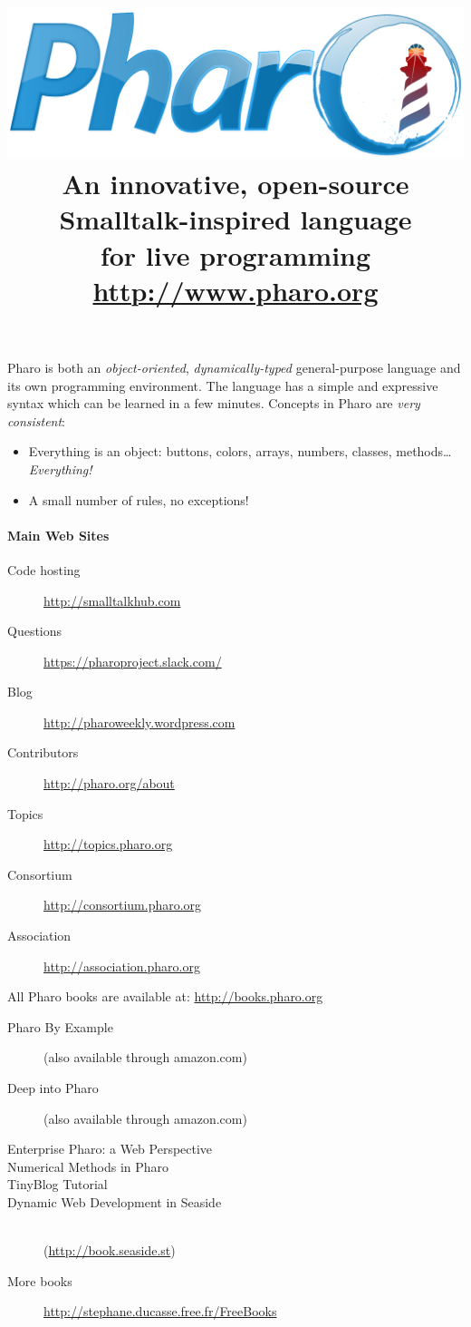 \documentclass[notumble]{leaflet}
\title{
\normalfont
\includegraphics[width=0.7\linewidth]{logo.pdf}
\\[1.2\baselineskip]%
\fontseries{cl}\selectfont\Large
An innovative, open-source Smalltalk-inspired language \\for live programming\\
\url{http://www.pharo.org}}
\date{}
\begin{document}
\maketitle
\thispagestyle{empty}
Pharo is both an \emph{object-oriented}, \emph{dynamically-typed}
general-purpose language and its own programming environment. The
language has a simple and expressive syntax which can be learned
in a few minutes. Concepts in Pharo are \emph{very consistent}:
\begin{itemize}
  \item Everything is an object: buttons, colors, arrays, numbers, classes, methods\ldots \emph{Everything!}
  \item A small number of rules, no exceptions!
\end{itemize}

\paragraph{Main Web Sites}
\begin{description}
 \item[Code hosting] \url{http://smalltalkhub.com}
 \item[Questions]    \url{https://pharoproject.slack.com/}
 \item[Blog] \url{http://pharoweekly.wordpress.com}
 \item[Contributors] \url{http://pharo.org/about}
 \item[Topics]       \url{http://topics.pharo.org}
 \item[Consortium]   \url{http://consortium.pharo.org}
 \item[Association]  \url{http://association.pharo.org}
\end{description}

All Pharo books are available at: \url{http://books.pharo.org}
\begin{description}
\item[Pharo By Example]
  (also available through amazon.com)
\item[Deep into Pharo]
  (also available through amazon.com)
\item [Enterprise Pharo: a Web Perspective]
\item [Numerical Methods in Pharo]
\item [TinyBlog Tutorial]
\item [Dynamic Web Development in Seaside]~\\ 
(\url{http://book.seaside.st})
\item[More books] \url{http://stephane.ducasse.free.fr/FreeBooks}
\end{description}
\end{document}

